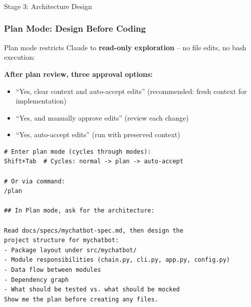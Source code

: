 \begin{frame}[fragile]\frametitle{}
\begin{center}
{\Large Stage 3: Architecture Design}

\end{center}
\end{frame}


\begin{frame}[fragile]\frametitle{Plan Mode: Design Before Coding}
Plan mode restricts Claude to \textbf{read-only exploration} -- no file edits, no bash execution:

\textbf{After plan review, three approval options:}
  \begin{itemize}
    \item ``Yes, clear context and auto-accept edits'' (recommended: fresh context for implementation)
    \item ``Yes, and manually approve edits'' (review each change)
    \item ``Yes, auto-accept edits'' (run with preserved context)
  \end{itemize}

\begin{lstlisting}
# Enter plan mode (cycles through modes):
Shift+Tab  # Cycles: normal -> plan -> auto-accept

# Or via command:
/plan

## In Plan mode, ask for the architecture:

Read docs/specs/mychatbot-spec.md, then design the
project structure for mychatbot:
- Package layout under src/mychatbot/
- Module responsibilities (chain.py, cli.py, app.py, config.py)
- Data flow between modules
- Dependency graph
- What should be tested vs. what should be mocked
Show me the plan before creating any files.
\end{lstlisting}


\end{frame}


